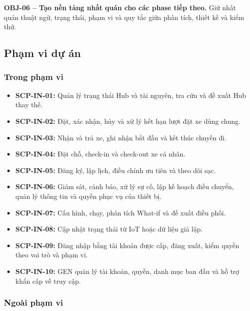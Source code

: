 \medskip
\noindent\textbf{OBJ-06 -- Tạo nền tảng nhất quán cho các phase tiếp theo.} Giữ nhất quán thuật ngữ, trạng thái, phạm vi và quy tắc giữa phân tích, thiết kế và kiểm thử.

\subsection{Phạm vi dự án}

\subsubsection*{Trong phạm vi}

\begin{itemize}
  \setlength{\itemsep}{0pt}
  \item \textbf{SCP-IN-01:} Quản lý trạng thái Hub và tài nguyên, tra cứu và đề xuất Hub thay thế.
  \item \textbf{SCP-IN-02:} Đặt, xác nhận, hủy và xử lý hết hạn lượt đặt xe dùng chung.
  \item \textbf{SCP-IN-03:} Nhận và trả xe, ghi nhận bắt đầu và kết thúc chuyến đi.
  \item \textbf{SCP-IN-04:} Đặt chỗ, check-in và check-out xe cá nhân.
  \item \textbf{SCP-IN-05:} Đăng ký, lập lịch, điều chỉnh ưu tiên và theo dõi sạc.
  \item \textbf{SCP-IN-06:} Giám sát, cảnh báo, xử lý sự cố, lập kế hoạch điều chuyển, quản lý thông tin và quyền phục vụ của thiết bị.
  \item \textbf{SCP-IN-07:} Cấu hình, chạy, phân tích What-if và đề xuất điều phối.
  \item \textbf{SCP-IN-08:} Cập nhật trạng thái từ IoT hoặc dữ liệu giả lập.
  \item \textbf{SCP-IN-09:} Đăng nhập bằng tài khoản được cấp, đăng xuất, kiểm quyền theo vai trò và phạm vi.
  \item \textbf{SCP-IN-10:} GEN quản lý tài khoản, quyền, danh mục ban đầu và hỗ trợ khẩn cấp về truy cập.
\end{itemize}

\subsubsection*{Ngoài phạm vi}

